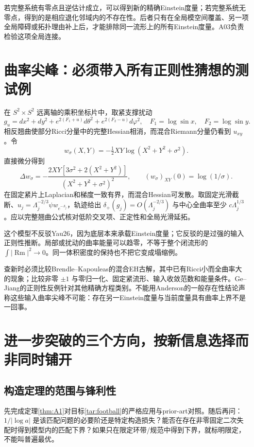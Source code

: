 \documentclass[UTF8,a4paper,11pt,fontset=fandol]{ctexart}
\numberwithin{equation}{section}
\theoremstyle{definition}
\newcommand{\Rm}{\operatorname{Rm}}
\begin{document}
若完整系统有零点且逆估计成立，可以得到新的精确Einstein度量；若完整系统无零点，得到的是相应退化邻域内的不存在性。后者只有在全局模空间覆盖、另一项全局障碍或拓扑理由补上后，才能排除同一流形上的所有Einstein度量。A03负责检验这项全局连接。

\section{曲率尖峰：必须带入所有正则性猜想的测试例}
在 $S^2\times S^2$ 远离轴的乘积坐标片中，取紧支撑扰动
\[
g_u=dx^2+dy^2+e^{2(F_1+u)}d\theta^2+e^{2(F_2-u)}d\varphi^2,
\quad F_1=\log\sin x,\quad F_2=\log\sin y.
\]
相反翘曲使部分Ricci分量中的完整Hessian相消，而混合Riemann分量仍看到 $u_{xy}$。令
\[
w_\sigma(X,Y)=-\tfrac12XY\log(X^2+Y^2+\sigma^2).
\]
直接微分得到
\begin{equation}\label{eq:CZ}
\Delta w_\sigma=-\frac{2XY[3\sigma^2+2(X^2+Y^2)]}{(X^2+Y^2+\sigma^2)^2},
\qquad (w_\sigma)_{XY}(0)=\log(1/\sigma).
\end{equation}
在固定紧片上Laplacian和梯度一致有界，而混合Hessian可发散。取固定光滑截断、$u_j=\Lambda_j^{-2/3}\psi w_{e^{-\Lambda_j}}$，轨迹给出 $\delta_+(g_j)=O(\Lambda_j^{-2/3})$ 与中心全曲率至少 $c\Lambda_j^{1/3}$。应以完整翘曲公式核对低阶交叉项、正定性和全局光滑延拓。

这个模型不反驳Yau26，因为底层本来承载Einstein度量；它反驳的是过强的输入正则性推断。局部或扰动的曲率能量可以趋零，不等于整个闭流形的 $\int|\Rm|^2\to0$。同一体积密度的保持也不把它变成塌缩例。

查新时必须比较Brendle--Kapouleas的混合EH古解，其中已有Ricci小而全曲率大的现象\cite{BK}；比较非零 $\pm1$ 与零归一化、固定紧流形、输入收敛范数和能量条件。Ge--Jiang的正则性反例针对其他精确方程类别\cite{GJ2017}。不能用Anderson的一般存在性结论声称这些输入曲率尖峰不可能：存在另一Einstein度量与当前度量具有曲率上界不是一回事\cite{Anderson1989}。

\section{进一步突破的三个方向，按新信息选择而非同时铺开}
\subsection{构造定理的范围与锋利性}
先完成定理\ref{thm:A1}对目标\ref{tar:football}的严格应用与prior-art对照。随后再问：$1/|\log a|$ 是该匹配问题的必要阶还是特定构造损失？能否在存在非零固定二次失配时得到模型内的匹配下界？如果只在限定环带/规范中得到下界，就标明限定，不能叫普遍最优。
\end{document}

